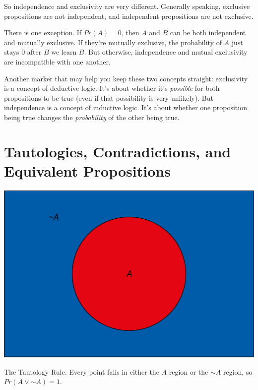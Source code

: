 \documentclass[justified]{tufte-book}
\renewcommand{\neg}{\mathbin{\sim}}
\newcommand{\p}{Pr}
\theoremstyle{definition}
\theoremstyle{definition}
\theoremstyle{definition}
\theoremstyle{remark}
\begin{document}
So independence and exclusivity are very different. Generally speaking, exclusive propositions are not independent, and independent propositions are not exclusive.

There is one exception. If \(\p(A) = 0\), then \(A\) and \(B\) can be both independent and mutually exclusive. If they're mutually exclusive, the probability of \(A\) just stays \(0\) after \(B\) we learn \(B\). But otherwise, independence and mutual exclusivity are incompatible with one another.

Another marker that may help you keep these two concepts straight: exclusivity is a concept of deductive logic. It's about whether it's \emph{possible} for both propositions to be true (even if that possibility is very unlikely). But independence is a concept of inductive logic. It's about whether one proposition being true changes the \emph{probability} of the other being true.

\hypertarget{tautologies-contradictions-and-equivalent-propositions}{%
\section{Tautologies, Contradictions, and Equivalent Propositions}\label{tautologies-contradictions-and-equivalent-propositions}}

\begin{marginfigure}
\includegraphics{_main_files/figure-latex/unnamed-chunk-56-1} \caption[The Tautology Rule]{The Tautology Rule. Every point falls in either the $A$ region or the $\neg A$ region, so $\p(A \vee \neg A) = 1$.}\label{fig:unnamed-chunk-56}
\end{marginfigure}
\end{document}
